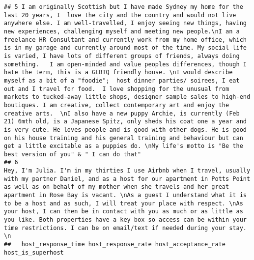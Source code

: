 \documentclass[
]{article}
\begin{document}
\begin{verbatim}
## 5 I am originally Scottish but I have made Sydney my home for the last 20 years, I  love the city and the country and would not live anywhere else. I am well-travelled, I enjoy seeing new things, having new experiences, challenging myself and meeting new people.\nI an a freelance HR Consultant and currently work from my home office, which is in my garage and currently around most of the time. My social life is varied, I have lots of different groups of friends, always doing something.   I am open-minded and value peoples differences, though I hate the term, this is a GLBTQ friendly house. \nI would describe myself as a bit of a "foodie";  host dinner parties/ soirees, I eat out and I travel for food.  I love shopping for the unusual from markets to tucked-away little shops, designer sample sales to high-end boutiques. I am creative, collect contemporary art and enjoy the creative arts.  \nI also have a new puppy Archie, is currently (Feb 21) 6mth old, is a Japanese Spitz, only sheds his coat one a year and is very cute. He loves people and is good with other dogs. He is good on his house training and his general training and behaviour but can get a little excitable as a puppies do. \nMy life's motto is "Be the best version of you" & " I can do that" 
## 6                                                                                                                                                                                                                                                                                                                                                                                                                                                                                                                                                                                                                                                                                                                                        Hey, I'm Julia. I'm in my thirties I use Airbnb when I travel, usually with my partner Daniel, and as a host for our apartment in Potts Point as well as on behalf of my mother when she travels and her great apartment in Rose Bay is vacant. \nAs a guest I understand what it is to be a host and as such, I will treat your place with respect. \nAs your host, I can then be in contact with you as much or as little as you like. Both properties have a key box so access can be within your time restrictions. I can be on email/text if needed during your stay. \n
##   host_response_time host_response_rate host_acceptance_rate host_is_superhost

\end{verbatim}
\end{document}

